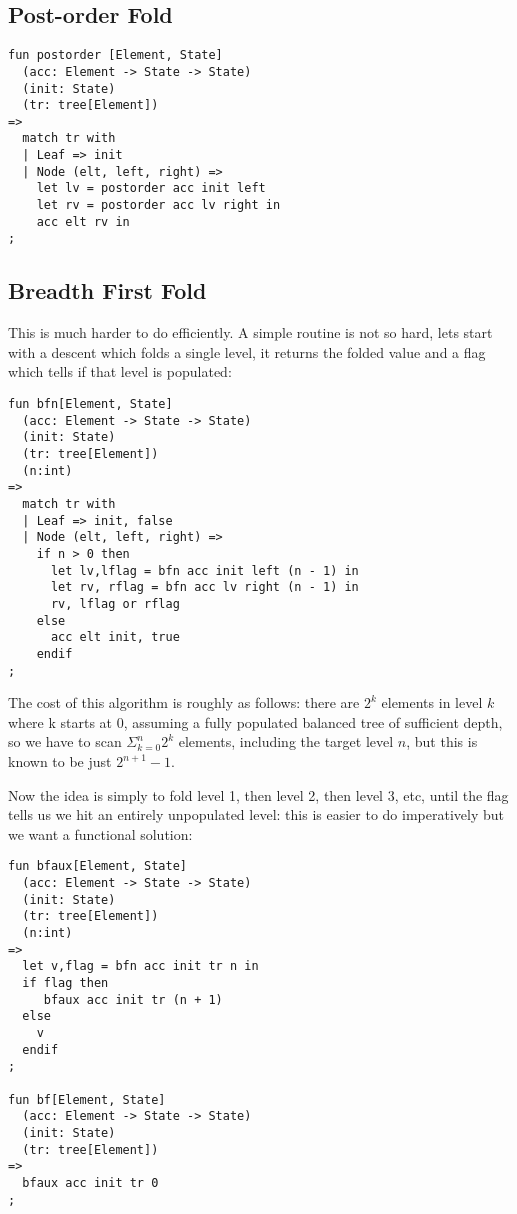 \documentclass[oneside]{book}
\begin{document}
\subsection{Post-order Fold}

\begin{verbatim}
fun postorder [Element, State]
  (acc: Element -> State -> State)
  (init: State)
  (tr: tree[Element])
=>
  match tr with
  | Leaf => init
  | Node (elt, left, right) =>
    let lv = postorder acc init left
    let rv = postorder acc lv right in
    acc elt rv in
;
\end{verbatim}

\subsection{Breadth First Fold}
This is much harder to do efficiently. 
A simple routine is not so hard, lets start
with a descent which folds a single level,
it returns the folded value and a flag which
tells if that level is populated:

\begin{verbatim}
fun bfn[Element, State]
  (acc: Element -> State -> State)
  (init: State)
  (tr: tree[Element])
  (n:int)
=>
  match tr with
  | Leaf => init, false
  | Node (elt, left, right) =>
    if n > 0 then
      let lv,lflag = bfn acc init left (n - 1) in
      let rv, rflag = bfn acc lv right (n - 1) in
      rv, lflag or rflag
    else 
      acc elt init, true
    endif
;
\end{verbatim}

The cost of this algorithm is roughly as follows: there are $2^k$ elements
in level $k$ where k starts at 0, assuming a fully populated balanced
tree of sufficient depth, so we have to scan $\Sigma_{k=0}^n 2^k$
elements, including the target level $n$, but this is known
to be just $2^{n+1}-1$.

Now the idea is simply to fold level 1, then level 2, 
then level 3, etc, until the flag tells us we hit an
entirely unpopulated level: this is easier to do
imperatively but we want a functional solution:


\begin{verbatim}
fun bfaux[Element, State]
  (acc: Element -> State -> State)
  (init: State)
  (tr: tree[Element])
  (n:int)
=>
  let v,flag = bfn acc init tr n in
  if flag then 
     bfaux acc init tr (n + 1)
  else 
    v
  endif
;

fun bf[Element, State]
  (acc: Element -> State -> State)
  (init: State)
  (tr: tree[Element])
=>
  bfaux acc init tr 0
;
\end{verbatim}
\end{document}

